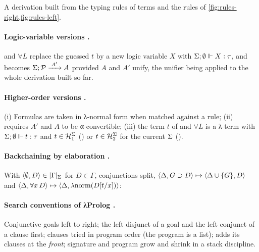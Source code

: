 \begin{definition}\label{def:rules-oproof}
A derivation built from the typing rules of terms and the rules of \cref{fig:rules-right,fig:rules-left}.
\end{definition}

\paragraph{Logic-variable versions .}  and $\forall L$ replace the guessed $t$ by a new logic variable $X$ with $\Sigma;\emptyset\Vdash X:\tau$, and  becomes $\Sigma;\mathcal{P}\xrightarrow{\;A'\;}A$ provided $A$ and $A'$ unify, the unifier being applied to the whole derivation built so far.

\paragraph{Higher-order versions .} (i) Formulas are taken in λ-normal form when matched against a rule; (ii)  requires $A'$ and $A$ to be α-convertible; (iii) the term $t$ of  and $\forall L$ is a λ-term with $\Sigma;\emptyset\Vdash t:\tau$ and $t\in\mathcal H_1^\Sigma$ (\hohc) or $t\in\mathcal H_2^\Sigma$ for the current $\Sigma$ (\hohh).

\paragraph{Backchaining by elaboration \cite[p.\,9]{Miller1991}.}
With $\langle\emptyset,D\rangle\in|\Gamma|_\Sigma$ for $D\in\Gamma$, conjunctions split, $\langle\Delta,G\supset D\rangle\mapsto\langle\Delta\cup\{G\},D\rangle$ and $\langle\Delta,\forall x\,D\rangle\mapsto\langle\Delta,\lambda\mathrm{norm}(D[t/x])\rangle$:
\begin{mathpar}
\end{mathpar}

\paragraph{Search conventions of λProlog .} Conjunctive goals left to right; the left disjunct of a goal and the left conjunct of a clause first; clauses tried in program order (the program is a list);  adds its clauses at the \emph{front}; signature and program grow and shrink in a stack discipline.

